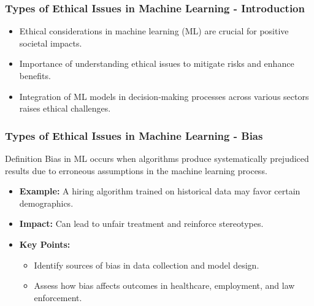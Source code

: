 \documentclass[aspectratio=169]{beamer}
\begin{document}
\begin{frame}[fragile]
    \frametitle{Types of Ethical Issues in Machine Learning - Introduction}
    \begin{itemize}
        \item Ethical considerations in machine learning (ML) are crucial for positive societal impacts.
        \item Importance of understanding ethical issues to mitigate risks and enhance benefits.
        \item Integration of ML models in decision-making processes across various sectors raises ethical challenges.
    \end{itemize}
\end{frame}

\begin{frame}[fragile]
    \frametitle{Types of Ethical Issues in Machine Learning - Bias}
    \begin{block}{Definition}
        Bias in ML occurs when algorithms produce systematically prejudiced results due to erroneous assumptions in the machine learning process.
    \end{block}
    \begin{itemize}
        \item \textbf{Example:} A hiring algorithm trained on historical data may favor certain demographics.
        \item \textbf{Impact:} Can lead to unfair treatment and reinforce stereotypes.
        \item \textbf{Key Points:}
        \begin{itemize}
            \item Identify sources of bias in data collection and model design.
            \item Assess how bias affects outcomes in healthcare, employment, and law enforcement.
        \end{itemize}
    \end{itemize}
\end{frame}
\end{document}
